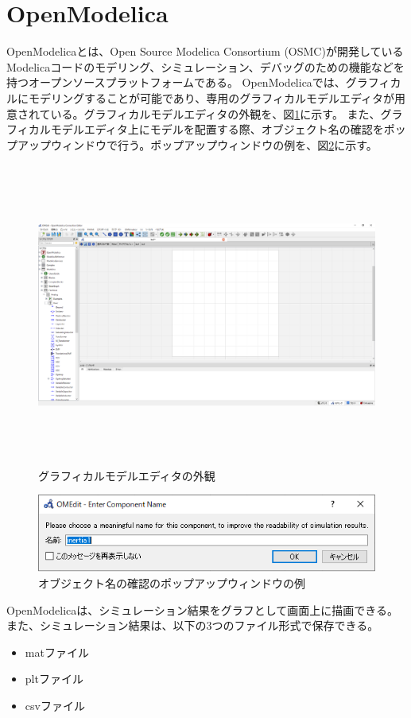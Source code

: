 \section{OpenModelica}\label{OM}
OpenModelicaとは、Open Source Modelica Consortium (OSMC)が開発しているModelicaコードのモデリング、シミュレーション、デバッグのための機能などを
持つオープンソースプラットフォームである\cite{fritzson2006openmodelica}。
OpenModelicaでは、グラフィカルにモデリングすることが可能であり、専用のグラフィカルモデルエディタが用意されている。グラフィカルモデルエディタの外観を、図\ref{fig:OM_GUI}に示す。
また、グラフィカルモデルエディタ上にモデルを配置する際、オブジェクト名の確認をポップアップウィンドウで行う。ポップアップウィンドウの例を、図\ref{fig:name_ob}に示す。
\begin{figure}[t]
	\centering
	\includegraphics[width=16.5cm,height=10cm]{./Image/OM_GUI.png}
	\caption{グラフィカルモデルエディタの外観}
	\label{fig:OM_GUI}
\end{figure}
\begin{figure}[t]
	\centering
	\includegraphics[width=12cm]{./Image/name_ob.png}
	\caption{オブジェクト名の確認のポップアップウィンドウの例}
	\label{fig:name_ob}
\end{figure}
OpenModelicaは、シミュレーション結果をグラフとして画面上に描画できる。また、シミュレーション結果は、以下の3つのファイル形式で保存できる。
\begin{itemize}
    \item matファイル
    \item pltファイル
    \item csvファイル
\end{itemize}

